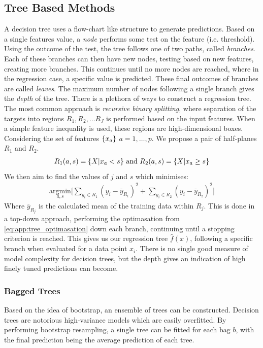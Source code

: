         \subsection{Tree Based Methods}
            A decision tree uses a flow-chart like structure to generate predictions. Based on a single features value, a \textit{node} performs some test on the feature (i.e. threshold). Using the outcome of the test, the tree follows one of two paths, called \textit{branches}. Each of these branches can then have new nodes, testing based on new features, creating more branches. This continues until no more nodes are reached, where in the regression case, a specific value is predicted. These final outcomes of branches are called \textit{leaves}. The maximum number of nodes following a single branch gives the \textit{depth} of the tree. 
            There is a plethora of ways to construct a regression tree. The most common approach is \textit{recursive binary splitting}, where separation of the targets into regions $R_1, R_2, \ldots R_J$ is performed based on the input features. When a simple feature inequality is used, these regions are high-dimensional boxes. Considering the set of features $\{x_a\}$ $a = 1,\ldots,p$. We propose a pair of half-planes $R_1$ and $R_2$. 
            \begin{align*}
                R_1(a,s) = \{X | x_a < s\} \text{ and } R_2(a,s) = \{X | x_a \geq s\}
            \end{align*}
            We then aim to find the values of $j$ and $s$ which minimises:
            \begin{align}
                \underset{a,s}{\text{argmin}}\Bigg[ \sum_{y_i \in R_1} (y_i - \bar{y}_{R_1})^2 + \sum_{y_i \in R_2} (y_i - \bar{y}_{R_2})^2 \Bigg] \label{eq:app:tree_optimasation} 
            \end{align}
            Where $\bar{y}_{R_j}$ is the calculated mean of the training data within $R_j$. This is done in a top-down approach, performing the optimasation from \cref{eq:app:tree_optimasation} down each branch, continuing until a stopping criterion is reached. This gives us our regression tree $\hat{f}(x)$, following a specific branch when evaluated for a data point $x_i$. There is no single good measure of model complexity for decision trees, but the depth gives an indication of high finely tuned predictions can become.    

            \subsubsection{Bagged Trees}
                Based on the idea of bootstrap, an ensemble of trees can be constructed. Decision trees are notorious high-variance models which are easily overfitted. By performing bootstrap resampling, a single tree can be fitted for each bag $b$, with the final prediction being the average prediction of each tree.


